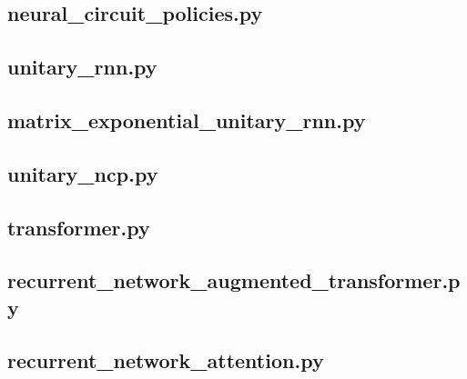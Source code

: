 \documentclass[draft,final]{vutinfth} %
\begin{document}
    \subsection{neural\_circuit\_policies.py}
    

    \subsection{unitary\_rnn.py}
    

    \subsection{matrix\_exponential\_unitary\_rnn.py}
    

    \subsection{unitary\_ncp.py}
    

    \subsection{transformer.py}
    

    \subsection{recurrent\_network\_augmented\_transformer.py}
    

    \subsection{recurrent\_network\_attention.py}
    
\end{document}
